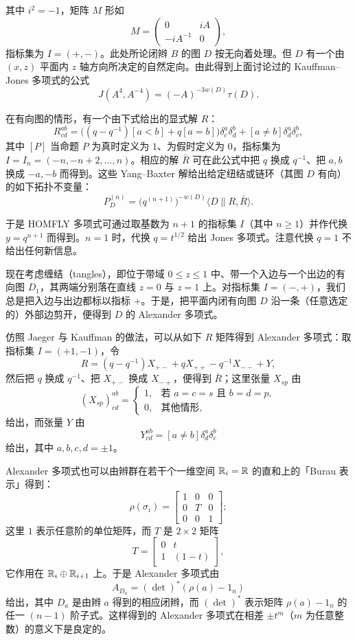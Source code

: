 
\noindent 其中 $i^2=-1$，矩阵 $M$ 形如
\[
M=\begin{pmatrix}0&iA\\-iA^{-1}&0\end{pmatrix},
\]
指标集为 $I=(+,-)$。此处所论闭辫 $B$ 的图 $D$ 按无向着处理。但 $D$ 有一个由 $(x,z)$ 平面内 $z$ 轴方向所决定的自然定向。由此得到上面讨论过的 Kauffman--Jones 多项式的公式
\[
J(A^4,A^{-4})=(-A)^{-3w(D)}\tau(D).
\]

在有向图的情形，有一个由下式给出的显式解 $R$：
\[
R_{cd}^{ab}=\bigl((q-q^{-1})[a<b]+q[a=b]\bigr)\delta_c^a\delta_d^b+[a\ne b]\delta_d^a\delta_c^b,
\]
其中 $[P]$ 当命题 $P$ 为真时定义为 $1$、为假时定义为 $0$，指标集为 $I=I_n=(-n,-n+2,\dots,n)$。相应的解 $\bar R$ 可在此公式中把 $q$ 换成 $q^{-1}$、把 $a,b$ 换成 $-a,-b$ 而得到。这些 Yang--Baxter 解给出给定纽结或链环（其图 $D$ 有向）的如下拓扑不变量：
\[
P_D^{(n)}=\bigl(q^{(n+1)}\bigr)^{-w(D)}\langle D\|R,\bar R\rangle.
\]

于是 HOMFLY 多项式可通过取基数为 $n+1$ 的指标集 $I$（其中 $n\ge 1$）并作代换 $y=q^{n+1}$ 而得到。$n=1$ 时，代换 $q=t^{1/2}$ 给出 Jones 多项式。注意代换 $q=1$ 不给出任何新信息。

现在考虑缠结（tangles），即位于带域 $0\le z\le 1$ 中、带一个入边与一个出边的有向图 $D_1$，其两端分别落在直线 $z=0$ 与 $z=1$ 上。对指标集 $I=(-,+)$，我们总是把入边与出边都标以指标 $+$。于是，把平面内闭有向图 $D$ 沿一条（任意选定的）外部边剪开，便得到 $D$ 的 Alexander 多项式。


仿照 Jaeger 与 Kauffman 的做法，可以从如下 $R$ 矩阵得到 Alexander 多项式：取指标集 $I=(+1,-1)$，令
\[
R=(q-q^{-1})X_{+-}+qX_{++}-q^{-1}X_{--}+Y,
\]
然后把 $q$ 换成 $q^{-1}$、把 $X_{+-}$ 换成 $X_{-+}$，便得到 $\bar R$；这里张量 $X_{sp}$ 由
\[
(X_{sp})_{cd}^{ab}=
\begin{cases}
1, & \text{若 } a=c=s \text{ 且 } b=d=p,\\
0, & \text{其他情形},
\end{cases}
\]
给出，而张量 $Y$ 由
\[
Y_{cd}^{ab}=[a\ne b]\delta_d^a\delta_c^b
\]
给出，其中 $a,b,c,d=\pm1$。

Alexander 多项式也可以由辫群在若干个一维空间 $\mathbb{R}_i=\mathbb{R}$ 的直和上的「Burau 表示」得到：
\[
\rho(\sigma_i)=
\begin{bmatrix}
1&0&0\\
0&T&0\\
0&0&1
\end{bmatrix};
\]
这里 $1$ 表示任意阶的单位矩阵，而 $T$ 是 $2\times2$ 矩阵
\[
T=\begin{bmatrix}0&t\\1&(1-t)\end{bmatrix},
\]
它作用在 $\mathbb{R}_i\oplus\mathbb{R}_{i+1}$ 上。于是 Alexander 多项式由
\[
A_{D_a}=(\det)^*(\rho(a)-1_n)
\]
给出，其中 $D_a$ 是由辫 $a$ 得到的相应闭辫，而 $(\det)^*$ 表示矩阵 $\rho(a)-1_n$ 的任一 $(n-1)$ 阶子式。这样得到的 Alexander 多项式在相差 $\pm t^m$（$m$ 为任意整数）的意义下是良定的。

